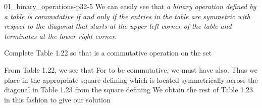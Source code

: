 \documentclass[11pt,oneside]{article}
\begin{document}
\begin{BookBody}
\begin{BookFloat}{01_binary_operations-p32-5}
We can easily see that \textit{a binary operation defined by a table is commutative if and only if the entries in the table are symmetric with respect to the diagonal that starts at the upper left corner of the table and terminates at the lower right corner}.
\end{BookFloat}

 Complete Table 1.22 so that \BookInline{\ast } is a commutative operation on the set 

 From Table 1.22, we see that  For \BookInline{\ast } to be commutative, we must have   also. Thus we place  in the appropriate square defining  which is located symmetrically across the diagonal in Table 1.23 from the square defining  We obtain the rest of Table 1.23 in this fashion to give our solution\BookEnd{\blacktriangle}


\end{BookBody}
\end{document}
